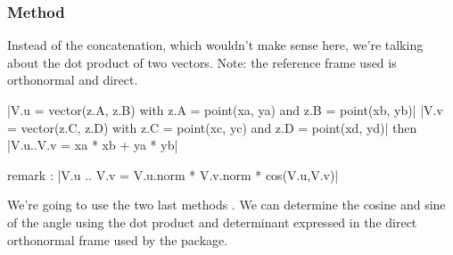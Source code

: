 \subsubsection{Method } %
\label{ssub:method_vector_dot}
Instead of the concatenation, which wouldn't make sense here, we're talking about the dot product of two vectors. Note: the reference frame used is orthonormal and direct. 

\begin{mybox}
|V.u = vector(z.A, z.B) with z.A = point(xa, ya) and z.B = point(xb, yb)|
|V.v = vector(z.C, z.D) with z.C = point(xc, yc) and z.D = point(xd, yd)|
then |V.u..V.v = xa * xb +  ya * yb|
\end{mybox}

remark : |V.u .. V.v = V.u.norm * V.v.norm * cos(V.u,V.v)|


\label{ssub:calculating_the_angle_of_two_vectors}

We're going to use the two last methods . We can determine the cosine and sine of the angle using the dot product and determinant expressed in the direct orthonormal frame used by the package.

\begin{minipage}{.5\textwidth}
\end{minipage}
\begin{minipage}{.5\textwidth}
\begin{tkzexample}
\end{tkzexample}
\end{minipage}

